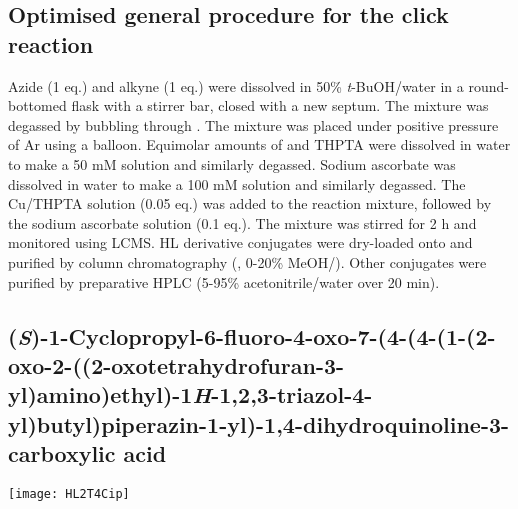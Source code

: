 \subsection{Optimised general procedure for the click reaction \label{sec:click_general}}

Azide (1 eq.) and alkyne (1 eq.) were dissolved in 50\% \textit{t}-BuOH/water in a round-bottomed flask with a stirrer bar, closed with a new septum. The mixture was degassed by bubbling through . The mixture was placed under positive pressure of Ar using a balloon. 
Equimolar amounts of  and THPTA  were dissolved in water to make a 50 mM solution and similarly degassed.
Sodium ascorbate was dissolved in water to make a 100 mM solution and similarly degassed.
The Cu/THPTA solution (0.05 eq.) was added to the reaction mixture, followed by the sodium ascorbate solution (0.1 eq.). The mixture was stirred for 2 h and monitored using LCMS.
HL derivative conjugates were dry-loaded onto  and purified by column chromatography (, 0-20\% MeOH/).
Other conjugates were purified by preparative HPLC (5-95\% acetonitrile/water over 20 min).

\subsection{(\textit{S})-1-Cyclopropyl-6-fluoro-4-oxo-7-(4-(4-(1-(2-oxo-2-((2-oxotetrahydrofuran\hyp{}3\hyp{}yl)amino)ethyl)-1\textit{H}-1,2,3-triazol-4-yl)butyl)piperazin-1-yl)-1,4-dihydroqui\allowbreak n\allowbreak oline-3-carboxylic acid }
	
	
	\begin{scheme}[H]
		\begin{center}
			\texttt{[image: HL2T4Cip]}
		\end{center}
	\end{scheme}

